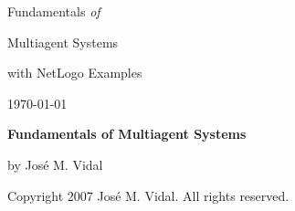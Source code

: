 \documentclass[10pt]{book}
\makeatletter
\def\cleardoublepage{\clearpage\if@twoside \ifodd\c@page\else
  \hbox{}
  \vspace*{\fill}
  \begin{center}
  \end{center}
  \vspace{\fill}
  \thispagestyle{empty}
  \newpage
  \if@twocolumn\hbox{}\newpage\fi\fi\fi}
\makeatother
\begin{document}
\thispagestyle{empty} %
\phantom{a} %
\vspace{3in}
{\Large Fundamentals \emph{of}}

\smallskip

{\Huge Multiagent Systems}

\smallskip

with NetLogo Examples

\bigskip


\vspace{1in}


\hfill\textsc{\today}


\newpage %
\phantom{a} 
\vspace{3in}
\thispagestyle{empty}
\textbf{Fundamentals of Multiagent Systems}

by Jos\'{e} M. Vidal

\smallskip

Copyright \textcopyright{} 2007 Jos\'{e} M. Vidal. All rights reserved.

\tableofcontents























\appendix
\nocite{aamas04,aamas05,aamas06} %

\cleardoublepage
{}
\nocite{aamas07}  %

\cleardoublepage
{}
\printindex
\end{document}
